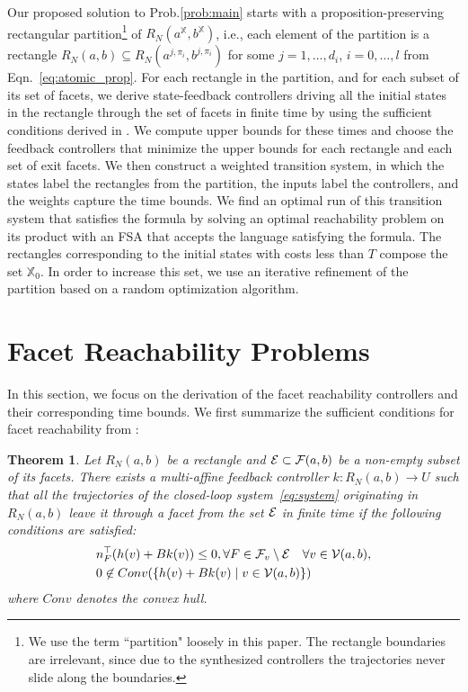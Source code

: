 \documentclass{ifacconf}
\newtheorem{theorem}{Theorem}
\newcommand{\FNab}{{\cal F}(a,b)}
\newcommand{\RNset}{R_N(a^{\mathbb{X}},b^{\mathbb{X}})}
\newcommand{\VNset}{\mathcal{V}(a,b)}
\newcommand{\RNab}{R_N(a,b)}
\newcommand{\XO}{\ensuremath{\mathbb{X}_0}}
\newcommand{\Fset}{{\cal E}}
\newcommand{\TIMEBOUND}{\ensuremath{T}}
\begin{document}
Our proposed solution to Prob.\ref{prob:main} starts with a proposition-preserving rectangular partition\footnote{We use the term ``partition" loosely in this paper. 
The rectangle boundaries are irrelevant, since due to the synthesized controllers the trajectories never slide along the boundaries.} of $\RNset$, i.e., each element of the partition is a rectangle $\RNab \subseteq R_N(a^{j,\pi_i},b^{j,\pi_i})$ for some $j=1,\ldots,d_i$, $i=0,\ldots,l$ from Eqn.~\eqref{eq:atomic_prop}.
For each rectangle in the partition, and for each subset of its set of facets, we derive state-feedback controllers driving all the initial states in the rectangle through the set of facets in finite time by using the sufficient conditions derived in \cite{Habets2006}. We compute upper bounds for these times and choose the feedback controllers that minimize the upper bounds for each rectangle and each set of exit facets. We then construct a weighted transition system, in which the states label the rectangles from the partition, the inputs label the controllers, and the weights capture the time bounds. We find an optimal run of this transition system that satisfies the formula by solving an optimal reachability 
problem on its product with an FSA that accepts the language satisfying the formula.
The rectangles corresponding to the initial states with costs less than $\TIMEBOUND$ compose the set $\XO$. In order to increase this set, we use an iterative refinement of  the partition based on a random optimization algorithm.

\section{Facet Reachability Problems}
\label{sec:control}

In this section, we focus on the derivation of the facet reachability 
controllers and their corresponding time bounds. We first summarize the 
sufficient conditions for facet reachability from \cite{Habets2006}:

\begin{theorem}\label{thm:facet_reachability}
Let $\RNab$ be a rectangle and $\Fset \subset \FNab$ be a non-empty subset of its facets. There exists a multi-affine feedback controller $k : \RNab \longrightarrow U$ such that all the trajectories of the closed-loop system~\eqref{eq:system} originating in $\RNab$ leave it through a facet from the set $\Fset$ in finite time if the following conditions are satisfied:
\begin{align}
  & n_{F}^\top(h(v) + Bk(v)) \leq 0 ,  \forall  F \in {\cal F}_v \setminus \Fset \hspace{10pt} \forall v\in \VNset,  \label{eq:neg_speed}\\
  & 0 \not \in Conv( \{  h(v) + Bk(v) \mid v \in \VNset \}) \label{eq:nozero}
\end{align}
where $Conv$ denotes the convex hull.
\end{theorem}
\end{document}
